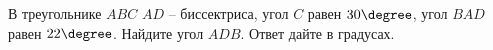 \begin{ex}
	\begin{condition}
		В треугольнике \( ABC \) \( AD \) – биссектриса, угол \( C \) равен \( 30\degree \), угол \( BAD \) равен \( 22\degree \). Найдите угол \( ADB \). Ответ дайте в градусах.
	\end{condition}
\end{ex}